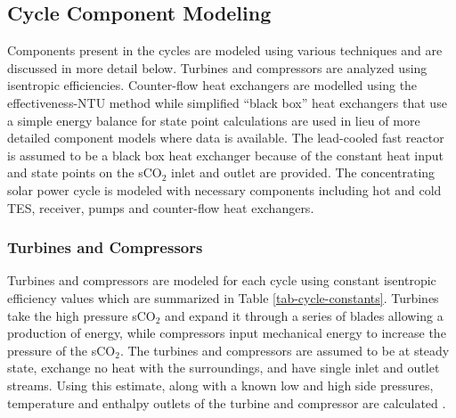 




\subsection{Cycle Component Modeling}
Components present in the cycles are modeled using various techniques and are discussed in more detail below. Turbines and compressors are analyzed using isentropic efficiencies. Counter-flow heat exchangers are modelled using the effectiveness-NTU method while simplified ``black box'' heat exchangers that use a simple energy balance for state point calculations are used in lieu of more detailed component models where data is available. The lead-cooled fast reactor is assumed to be a black box heat exchanger because of the constant heat input and state points on the sCO$_2$ inlet and outlet are provided. The concentrating solar power cycle is modeled with necessary components including hot and cold TES, receiver, pumps and counter-flow heat exchangers.



\subsubsection{Turbines and Compressors }

Turbines and compressors are modeled for each cycle using constant isentropic efficiency values which are summarized in Table \ref{tab-cycle-constants}. Turbines take the high pressure sCO$_2$ and expand it through a series of blades allowing a production of energy, while compressors input mechanical energy to increase the pressure of the sCO$_2$. The turbines and compressors are assumed to be at steady state, exchange no heat with the surroundings, and have single inlet and outlet streams. Using this estimate, along with a known low and high side pressures, temperature and enthalpy outlets of the turbine and compressor are calculated \cite{klein_nellis_2011}. 

